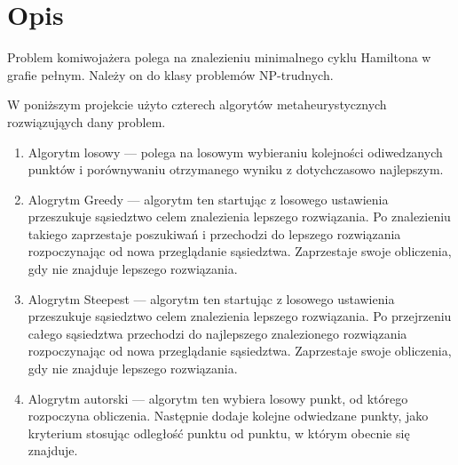 \section{Opis}

Problem komiwojażera polega na znalezieniu minimalnego cyklu Hamiltona
w grafie pełnym. Należy on do klasy problemów NP-trudnych. 

W poniższym projekcie użyto czterech algorytów metaheurystycznych rozwiązująych 
dany problem. 

\begin{enumerate}

\item Algorytm losowy --- polega na losowym wybieraniu kolejności odiwedzanych punktów i 
porównywaniu otrzymanego wyniku z dotychczasowo najlepszym.

\item Alogrytm Greedy --- algorytm ten startując z losowego ustawienia przeszukuje 
sąsiedztwo celem znalezienia lepszego rozwiązania. Po znalezieniu takiego zaprzestaje 
poszukiwań i przechodzi do lepszego rozwiązania rozpoczynając od nowa przeglądanie sąsiedztwa.
Zaprzestaje swoje obliczenia, gdy nie znajduje lepszego rozwiązania.

\item Alogrytm Steepest --- algorytm ten startując z losowego ustawienia przeszukuje 
sąsiedztwo celem znalezienia lepszego rozwiązania. Po przejrzeniu całego sąsiedztwa przechodzi 
do najlepszego znalezionego rozwiązania rozpoczynając od nowa przeglądanie sąsiedztwa.
Zaprzestaje swoje obliczenia, gdy nie znajduje lepszego rozwiązania.

\item Alogrytm autorski --- algorytm ten wybiera losowy punkt, od którego rozpoczyna obliczenia.
Następnie dodaje kolejne odwiedzane punkty, jako kryterium stosując odległość punktu od punktu, w 
którym obecnie się znajduje.

\end{enumerate}

